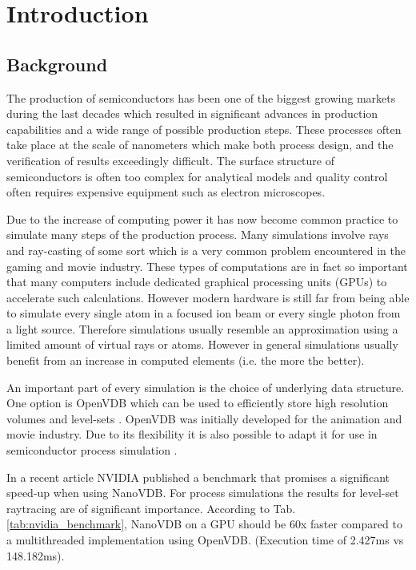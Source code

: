 \section{Introduction}
\subsection{Background}
The production of semiconductors has been one of the biggest growing markets during the last decades which resulted in significant advances in production capabilities and a wide range of possible production steps.
These processes often take place at the scale of nanometers which make both process design, and the verification of results exceedingly difficult.
The surface structure of semiconductors is often too complex for analytical models and quality control often requires expensive equipment such as electron microscopes.

Due to the increase of computing power it has now become common practice to simulate many steps of the production process.
Many simulations involve rays and ray-casting of some sort which is a very common problem encountered in the gaming and movie industry.
These types of computations are in fact so important that many computers include dedicated graphical processing units (GPUs) to accelerate such calculations.
However modern hardware is still far from being able to simulate every single atom in a focused ion beam or every single photon from a light source.
Therefore simulations usually resemble an approximation using a limited amount of virtual rays or atoms.
However in general simulations usually benefit from an increase in computed elements (i.e. the more the better).

An important part of every simulation is the choice of underlying data structure.
One option is OpenVDB which can be used to efficiently store high resolution volumes and level-sets \cite{openvdb}.
OpenVDB was initially developed for the animation and movie industry. Due to its flexibility it is also possible to adapt it for use in semiconductor process simulation \cite{manstetten2018efficient}.

In a recent article  NVIDIA published a benchmark that promises a significant speed-up when using NanoVDB.
For process simulations the results for level-set raytracing are of significant importance.
According to Tab. \ref{tab:nvidia_benchmark}, NanoVDB on a GPU should be 60x faster compared to a multithreaded implementation using OpenVDB. (Execution time of 2.427ms vs 148.182ms).


